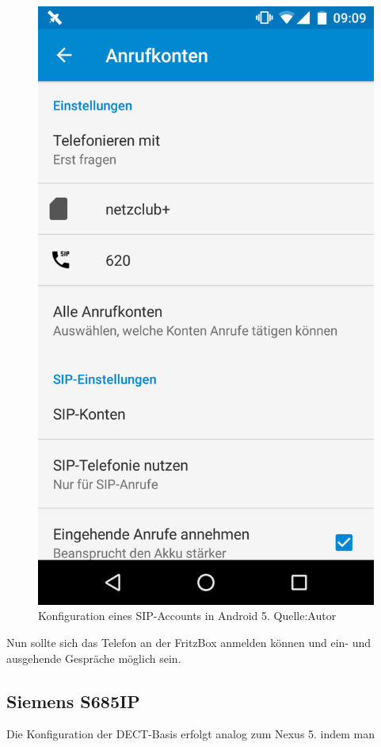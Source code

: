 \documentclass[a4paper,12pt]{scrbook}
\begin{document}
\begin{figure}[H]
\begin{center}
\includegraphics[width=.4\hsize]{./images/voip-client-nexus5.png}
\end{center}
\caption[Konfiguration eines SIP-Accounts in Android 5]
{\label{voip-client-nexus5}Konfiguration eines SIP-Accounts in Android 5. Quelle:Autor}
\end{figure}


Nun sollte sich das Telefon an der FritzBox anmelden können und ein- und ausgehende Gespräche möglich sein.

\subsection{Siemens S685IP}
Die Konfiguration der DECT-Basis erfolgt analog zum Nexus 5. indem man 
\end{document}
